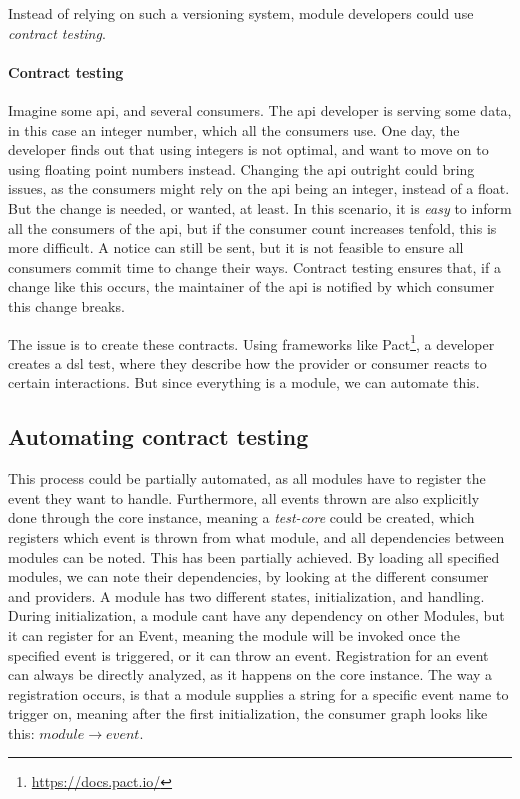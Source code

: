 Instead of relying on such a versioning system, module developers could use
\textit{contract testing}.

\paragraph{Contract testing} Imagine some \gls*{api}, and several consumers.
The \gls*{api} developer is serving some data, in this case an integer number,
which all the consumers use. One day, the developer finds out that using
integers is not optimal, and want to move on to using floating point numbers
instead. Changing the \gls*{api} outright could bring issues, as the consumers
might rely on the \gls*{api} being an integer, instead of a float. But the
change is needed, or wanted, at least. In this scenario, it is \textit{easy} to
inform all the consumers of the \gls*{api}, but if the consumer count increases
tenfold, this is more difficult. A notice can still be sent, but it is not
feasible to ensure all consumers commit time to change their ways. Contract
testing ensures that, if a change like this occurs, the maintainer of the
\gls*{api} is notified by which consumer this change breaks.

The issue is to create these contracts. Using frameworks like Pact\footnote{\url{https://docs.pact.io/}},
a developer creates a \gls*{dsl} test, where they describe how the provider or
consumer reacts to certain interactions. But since everything is a module, we
can automate this.

\subsection{Automating contract testing}

This process could be partially automated, as all modules have to register the
event they want to handle. Furthermore, all events thrown are also explicitly
done through the core instance, meaning a \textit{test-core} could be created,
which registers which event is thrown from what module, and all dependencies
between modules can be noted. This has been partially achieved. By loading all
specified modules, we can note their dependencies, by looking at the different
consumer and providers. A module has two different states, initialization, and
handling. During initialization, a module cant have any dependency on other
Modules, but it can register for an Event, meaning the module will be invoked
once the specified event is triggered, or it can throw an event. Registration
for an event can always be directly analyzed, as it happens on the core
instance. The way a registration occurs, is that a module supplies a string for
a specific event name to trigger on, meaning after the first initialization, the
consumer graph looks like this: $module \to event$.

